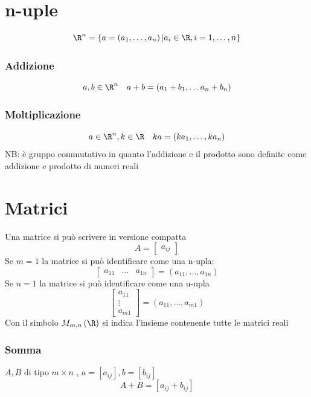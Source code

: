 \documentclass[12pt,a4paper,oneside]{article}
\begin{document}
\section{n-uple}
\[
	\R ^{n}= \left\{ a= \left( a_1, \ldots, a_n \right) | a_i  \in \R, i=1, \ldots , n \right\}
\]
\subsubsection*{Addizione}
\[
	a,b  \in  \R ^{n} \quad a+b = \left( a_1 + b_1 , \ldots a_n + b_n \right)
\]
\subsubsection*{Moltiplicazione}
\[
	a  \in  \R ^{n}, k  \in  \R \quad ka= \left( ka_1, \ldots, ka_n \right)
\]
NB: è gruppo commutativo in quanto l'addizione e il prodotto sono definite come addizione e prodotto di numeri reali

\section{Matrici}

Una matrice si può scrivere in versione compatta
\[
	A= \begin{bmatrix} a_{ij} \end{bmatrix}
\]
Se $m=1$ la matrice si può identificare come una n-upla:
\[
	\begin{bmatrix}
		a_{11} & \ldots & a_{1n}
	\end{bmatrix}
	=
	\left( 	a_{11},  \ldots, a_{1n} \right)
\]
Se $ n=1$ la matrice si può identificare come una u-upla
\[
	\begin{bmatrix}
		a_{11} \\ \vdots \\ a_{m1}
	\end{bmatrix}
	=
	\left( 	a_{11},  \ldots, a_{m1} \right)
\]
Con il simbolo $M_{m,n}\left( \R \right) $ si indica l'insieme contenente tutte le matrici reali

\subsubsection*{Somma}
\label{ssub:somma}
$A,B$ di tipo $m \times n$ , $ a = \left[ a_{ij} \right] , b= \left[ b_{ij} \right] $
\[
	A + B = \left[ a_{ij}+ b_{ij} \right]
\]
\end{document}
